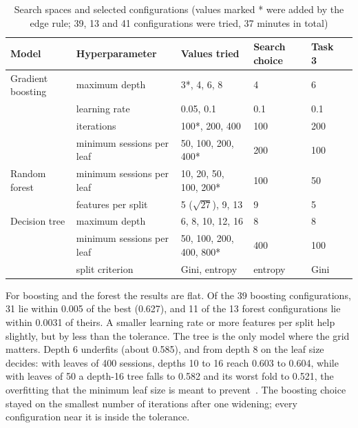 \documentclass[12pt,a4paper,openany]{report}
\begin{document}
\begin{table}[!htb]
  \centering\small
  \caption[Search spaces and selected configurations]{Search spaces and selected configurations (values marked * were added by the edge rule; 39, 13 and 41 configurations were tried, 37 minutes in total)}
  \label{tab:optim-grid}
  \setlength{\tabcolsep}{4pt}
  \begin{tabular*}{\textwidth}{@{\extracolsep{\fill}}llllll}
    \toprule
    Model & Hyperparameter & Values tried & Search choice & Task 3 \\
    \midrule
    Gradient boosting & maximum depth             & 3*, 4, 6, 8                 & 4       & 6 \\
                      & learning rate             & 0.05, 0.1                   & 0.1     & 0.1 \\
                      & iterations                & 100*, 200, 400              & 100     & 200 \\
                      & minimum sessions per leaf & 50, 100, 200, 400*          & 200     & 100 \\
    \midrule
    Random forest     & minimum sessions per leaf & 10, 20, 50, 100, 200*       & 100     & 50 \\
                      & features per split        & 5 ($\sqrt{27}$), 9, 13      & 9       & 5 \\
    \midrule
    Decision tree     & maximum depth             & 6, 8, 10, 12, 16            & 8       & 8 \\
                      & minimum sessions per leaf & 50, 100, 200, 400, 800*     & 400     & 100 \\
                      & split criterion           & Gini, entropy               & entropy & Gini \\
    \bottomrule
  \end{tabular*}
\end{table}

For boosting and the forest the results are flat. Of the 39 boosting configurations, 31 lie within 0.005 of the
best (0.627), and 11 of the 13 forest configurations lie within 0.0031 of theirs. A smaller learning rate or more
features per split help slightly, but by less than the tolerance. The tree is the only model where the grid
matters. Depth 6 underfits (about 0.585), and from depth 8 on the leaf size decides: with leaves of 400 sessions,
depths 10 to 16 reach 0.603 to 0.604, while with leaves of 50 a depth-16 tree falls to 0.582 and its worst fold to 0.521,
the overfitting that the minimum leaf size is meant to prevent~\cite{mindd05}. The boosting choice stayed on the
smallest number of iterations after one widening; every configuration near it is inside the tolerance.
\end{document}
